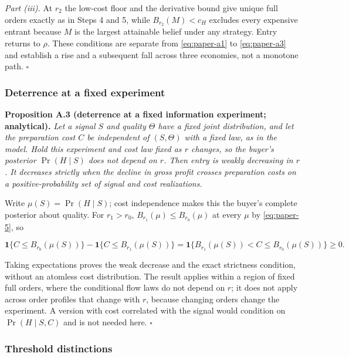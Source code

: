 \documentclass[
  12pt,
]{article}
\begin{document}
\emph{Part (iii).} At \(r_2\) the low-cost floor and the derivative
bound give unique full orders exactly as in Steps 4 and 5, while
\(B_{r_2}(M)<c_H\) excludes every expensive entrant because \(M\) is the
largest attainable belief under any strategy. Entry returns to \(\rho\).
These conditions are separate from \eqref{eq:paper-a1} to
\eqref{eq:paper-a3} and establish a rise and a subsequent fall across
three economies, not a monotone path. \(\square\)


\subsubsection{Deterrence at a fixed
experiment}\label{deterrence-at-a-fixed-experiment}

\protect{}\label{result-proposition-a-3}{\textbf{Proposition
A.3 (deterrence at a fixed information experiment; analytical).}}
\emph{Let a signal \(S\) and quality \(\Theta\) have a fixed joint
distribution, and let the preparation cost \(C\) be independent of
\((S,\Theta)\) with a fixed law, as in the model. Hold this experiment
and cost law fixed as \(r\) changes, so the buyer's posterior
\(\Pr(H\mid S)\) does not depend on \(r\). Then entry is weakly
decreasing in \(r\). It decreases strictly when the decline in gross
profit crosses preparation costs on a positive-probability set of signal
and cost realizations.}

Write \(\mu(S)=\Pr(H\mid S)\); cost independence makes this the buyer's
complete posterior about quality. For \(r_1>r_0\),
\(B_{r_1}(\mu)\le B_{r_0}(\mu)\) at every \(\mu\) by \eqref{eq:paper-5},
so

\[
\mathbf1\{C\le B_{r_0}(\mu(S))\}-\mathbf1\{C\le B_{r_1}(\mu(S))\}
=\mathbf1\{B_{r_1}(\mu(S))<C\le B_{r_0}(\mu(S))\}\ge0.
\tag{A.9}\label{eq:paper-a-9}
\]

Taking expectations proves the weak decrease and the exact strictness
condition, without an atomless cost distribution. The result applies
within a region of fixed full orders, where the conditional flow laws do
not depend on \(r\); it does not apply across order profiles that change
with \(r\), because changing orders change the experiment. A version
with cost correlated with the signal would condition on
\(\Pr(H\mid S,C)\) and is not needed here. \(\square\)


\subsubsection{Threshold distinctions}\label{threshold-distinctions}
\end{document}

